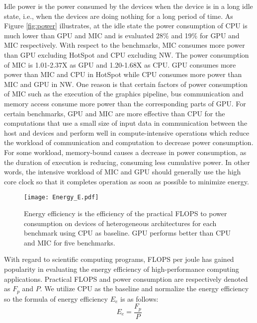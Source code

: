 Idle power is the power consumed by the devices when the device is in a long idle state, i.e., when the devices are doing nothing for a long period of time. As Figure \ref{fig:power} illustrates, at the idle state the power consumption of CPU is much lower than GPU and MIC and is evaluated 28\% and 19\% for GPU and MIC respectively. With respect to the benchmarks, MIC consumes more power than GPU excluding HotSpot and CPU excluding NW. The power consumption of MIC is 1.01-2.37X as GPU and 1.20-1.68X as CPU. GPU consumes more power than MIC and CPU in HotSpot while CPU consumes more power than MIC and GPU in NW. One reason is that certain factors of power consumption of MIC such as the execution of the graphics pipeline, bus communication and memory access consume more power than the corresponding parts of GPU. For certain benchmarks, GPU and MIC are more effective than CPU for the computations that use a small size of input data in communication between the host and devices and perform well in compute-intensive operations which reduce the workload of communication and computation to decrease power consumption. For some workload, memory-bound causes a decrease in power consumption, as the duration of execution is reducing, consuming less cumulative power. In other words, the intensive workload of MIC and GPU should generally use the high core clock so that it completes operation as soon as possible to minimize energy. 

   \begin{figure}[h!]
  \centering
  \begin{minipage}{0.5\textwidth}
    \centering
   \centering
     \texttt{[image: Energy\_E.pdf]}    
\caption{Energy efficiency is the efficiency of the practical FLOPS to power consumption on devices of heterogeneous architectures for each benchmark using CPU as baseline. GPU performs better than CPU and MIC for five benchmarks.} 
\label{fig:energyE}
\end{minipage}%
\end{figure}


With regard to scientific computing programs, FLOPS per joule has gained popularity in evaluating the energy efficiency of high-performance computing applications. Practical FLOPS and power consumption are respectively denoted as $F_{p}$ and $P$. We utilize CPU as the baseline and normalize the energy efficiency so the formula of energy efficiency $E_{e}$ is as follows:
\begin{equation}\label{equ:energyE}
  {E_{e}} = \frac{F_{p}}{P}
\end{equation}
  
